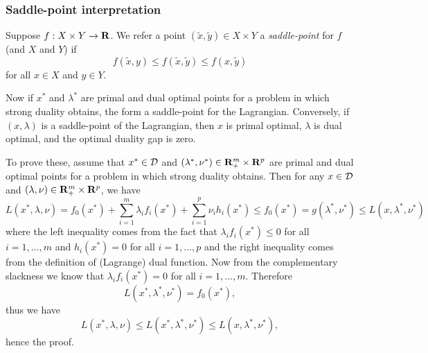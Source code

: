 \subsubsection{Saddle-point interpretation}

Suppose $f:X\times Y \to \mathbf{R}$.
We refer a point $(\tilde{x}, \tilde{y}) \in X\times Y$ a \emph{saddle-point}
for $f$ (and $X$ and $Y$) if
\begin{equation}
f(\tilde{x},y) \leq f(\tilde{x},\tilde{y}) \leq f(x, \tilde{y})
\end{equation}
for all $x \in X$ and $y\in Y$.

Now if $x^\ast$ and $\lambda^\ast$
are primal and dual optimal points for a problem in which strong duality obtains,
the form a saddle-point for the Lagrangian.
Conversely, if $(x,\lambda)$ is a saddle-point of the Lagrangian, then $x$ is primal optimal, $\lambda$ is dual optimal,
and the optimal duality gap is zero.

To prove these, assume that $x^\ast\in\mathcal{D}$ and $(\lambda^\ast, \nu^\ast) \in \mathbf{R}^m_+ \times \mathbf{R}^p$
are primal and dual optimal points for a problem in which strong duality obtains.
Then for any $x\in\mathcal{D}$ and $(\lambda, \nu) \in \mathbf{R}^m_+ \times \mathbf{R}^p$,
we have
\begin{equation}
L(x^\ast, \lambda, \nu) =
f_0(x^\ast) + \sum_{i=1}^m \lambda_i f_i(x^\ast) + \sum_{i=1}^p \nu_i h_i(x^\ast)
\leq
f_0(x^\ast) = g(\lambda^\ast, \nu^\ast) \leq L(x,\lambda^\ast, \nu^\ast)
\end{equation}
where the left inequality comes from the fact that $\lambda_i f_i(x^\ast) \leq 0$ for all $i=1,\ldots, m$
and $h_i(x^\ast)=0$ for all $i=1,\ldots, p$
and the right inequality comes from the definition of (Lagrange) dual function.
Now from the complementary slackness we know that $\lambda_i f_i(x^\ast) = 0$ for all $i=1,\ldots, m$.
Therefore
\begin{equation}
L(x^\ast,\lambda^\ast, \nu^\ast) = f_0(x^\ast),
\end{equation}
thus we have
\begin{equation}
L(x^\ast, \lambda, \nu)
\leq L(x^\ast, \lambda^\ast, \nu^\ast)
\leq L(x, \lambda^\ast, \nu^\ast),
\end{equation}
hence the proof.

